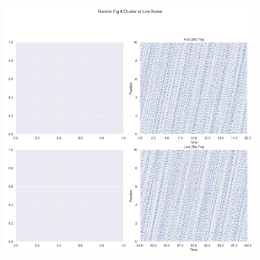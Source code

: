 \documentclass[11pt,a4paper, final, dvipsnames]{article}
\begin{document}
  \begin{figure}
    \centering
    \begin{minipage}[b]{\textwidth}
        \centering
        
        \includegraphics[width=\textwidth]{Figure4scaled1}
    \end{minipage} \\
    

\end{figure}
\end{document}
